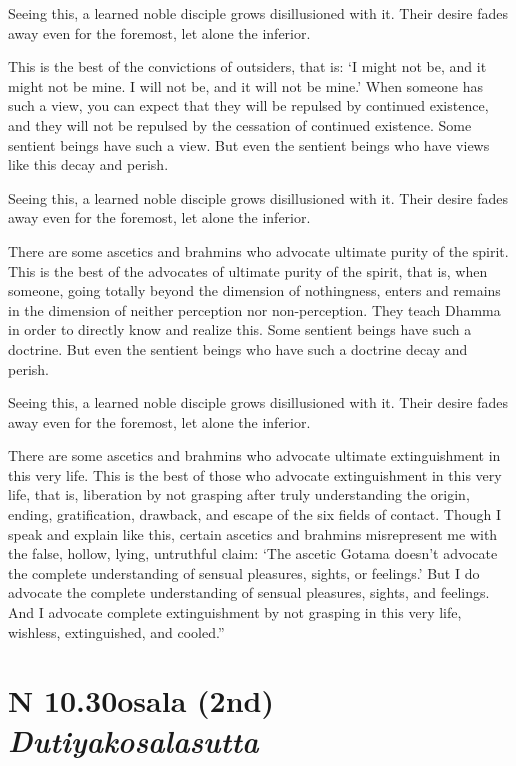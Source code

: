 \documentclass[12pt,openany]{book}%
\newcommand*{\suttatitleacronym}[1]{\smaller[2]{#1}\vspace*{.3em}}
\newcommand*{\suttatitletranslation}[1]{\linebreak{#1}}
\newcommand*{\suttatitleroot}[1]{\linebreak\smaller[2]\itshape{#1}}
\newcommand*{\tocacronym}[1]{\hspace*{-3.3em}{#1}\quad}
\newcommand*{\toctranslation}[1]{#1}
\newcommand*{\tocroot}[1]{(\textit{#1})}
\begin{document}
Seeing this, a learned noble disciple grows disillusioned with it. Their desire fades away even for the foremost, let alone the inferior. 

This is the best of the convictions of outsiders, that is: ‘I might not be, and it might not be mine. I will not be, and it will not be mine.’ When someone has such a view, you can expect that they will be repulsed by continued existence, and they will not be repulsed by the cessation of continued existence. Some sentient beings have such a view. But even the sentient beings who have views like this decay and perish. 

Seeing this, a learned noble disciple grows disillusioned with it. Their desire fades away even for the foremost, let alone the inferior. 

There are some ascetics and brahmins who advocate ultimate purity of the spirit. This is the best of the advocates of ultimate purity of the spirit, that is, when someone, going totally beyond the dimension of nothingness, enters and remains in the dimension of neither perception nor non-perception. They teach Dhamma in order to directly know and realize this. Some sentient beings have such a doctrine. But even the sentient beings who have such a doctrine decay and perish. 

Seeing this, a learned noble disciple grows disillusioned with it. Their desire fades away even for the foremost, let alone the inferior. 

There are some ascetics and brahmins who advocate ultimate extinguishment in this very life. This is the best of those who advocate extinguishment in this very life, that is, liberation by not grasping after truly understanding the origin, ending, gratification, drawback, and escape of the six fields of contact. Though I speak and explain like this, certain ascetics and brahmins misrepresent me with the false, hollow, lying, untruthful claim: ‘The ascetic Gotama doesn’t advocate the complete understanding of sensual pleasures, sights, or feelings.’ But I do advocate the complete understanding of sensual pleasures, sights, and feelings. And I advocate complete extinguishment by not grasping in this very life, wishless, extinguished, and cooled.” 

%
\section*{{\suttatitleacronym AN 10.30}{\suttatitletranslation Kosala (2nd) }{\suttatitleroot Dutiyakosalasutta}}
\addcontentsline{toc}{section}{\tocacronym{AN 10.30} \toctranslation{Kosala (2nd) } \tocroot{Dutiyakosalasutta}}
\end{document}
